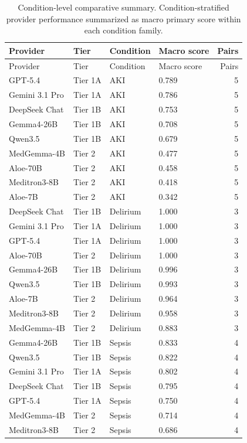 \scriptsize
\begin{longtable}{@{}llllr@{}}
\caption{Condition-level comparative summary. Condition-stratified provider performance summarized as macro primary score within each condition family.}\label{tab:condition_summary}\\
\toprule
Provider & Tier & Condition & Macro score & Pairs \\
\midrule
\endfirsthead
\toprule
Provider & Tier & Condition & Macro score & Pairs \\
\midrule
\endhead
GPT-5.4 & Tier 1A & AKI & 0.789 & 5 \\
Gemini 3.1 Pro & Tier 1A & AKI & 0.786 & 5 \\
DeepSeek Chat & Tier 1B & AKI & 0.753 & 5 \\
Gemma4-26B & Tier 1B & AKI & 0.708 & 5 \\
Qwen3.5 & Tier 1B & AKI & 0.679 & 5 \\
MedGemma-4B & Tier 2 & AKI & 0.477 & 5 \\
Aloe-70B & Tier 2 & AKI & 0.458 & 5 \\
Meditron3-8B & Tier 2 & AKI & 0.418 & 5 \\
Aloe-7B & Tier 2 & AKI & 0.342 & 5 \\
DeepSeek Chat & Tier 1B & Delirium & 1.000 & 3 \\
Gemini 3.1 Pro & Tier 1A & Delirium & 1.000 & 3 \\
GPT-5.4 & Tier 1A & Delirium & 1.000 & 3 \\
Aloe-70B & Tier 2 & Delirium & 1.000 & 3 \\
Gemma4-26B & Tier 1B & Delirium & 0.996 & 3 \\
Qwen3.5 & Tier 1B & Delirium & 0.993 & 3 \\
Aloe-7B & Tier 2 & Delirium & 0.964 & 3 \\
Meditron3-8B & Tier 2 & Delirium & 0.958 & 3 \\
MedGemma-4B & Tier 2 & Delirium & 0.883 & 3 \\
Gemma4-26B & Tier 1B & Sepsis & 0.833 & 4 \\
Qwen3.5 & Tier 1B & Sepsis & 0.822 & 4 \\
Gemini 3.1 Pro & Tier 1A & Sepsis & 0.802 & 4 \\
DeepSeek Chat & Tier 1B & Sepsis & 0.795 & 4 \\
GPT-5.4 & Tier 1A & Sepsis & 0.750 & 4 \\
MedGemma-4B & Tier 2 & Sepsis & 0.714 & 4 \\
Meditron3-8B & Tier 2 & Sepsis & 0.686 & 4 \\

\end{longtable}

